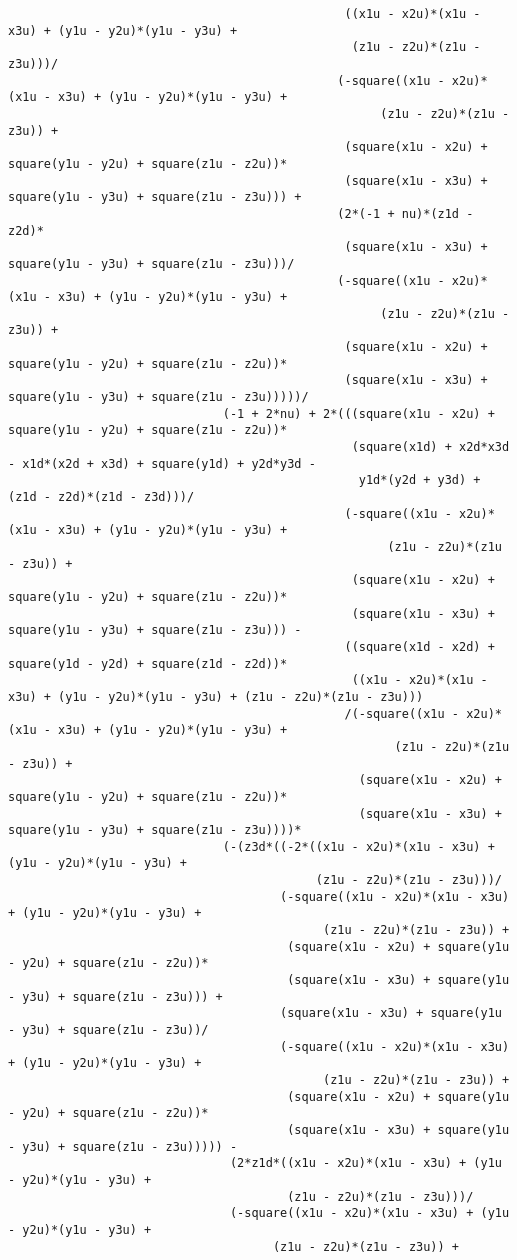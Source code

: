 \begin{lstlisting}
											   ((x1u - x2u)*(x1u - x3u) + (y1u - y2u)*(y1u - y3u) + 
												(z1u - z2u)*(z1u - z3u)))/
											  (-square((x1u - x2u)*(x1u - x3u) + (y1u - y2u)*(y1u - y3u) + 
													(z1u - z2u)*(z1u - z3u)) + 
											   (square(x1u - x2u) + square(y1u - y2u) + square(z1u - z2u))*
											   (square(x1u - x3u) + square(y1u - y3u) + square(z1u - z3u))) + 
											  (2*(-1 + nu)*(z1d - z2d)*
											   (square(x1u - x3u) + square(y1u - y3u) + square(z1u - z3u)))/
											  (-square((x1u - x2u)*(x1u - x3u) + (y1u - y2u)*(y1u - y3u) + 
													(z1u - z2u)*(z1u - z3u)) + 
											   (square(x1u - x2u) + square(y1u - y2u) + square(z1u - z2u))*
											   (square(x1u - x3u) + square(y1u - y3u) + square(z1u - z3u)))))/
							  (-1 + 2*nu) + 2*(((square(x1u - x2u) + square(y1u - y2u) + square(z1u - z2u))*
												(square(x1d) + x2d*x3d - x1d*(x2d + x3d) + square(y1d) + y2d*y3d - 
												 y1d*(y2d + y3d) + (z1d - z2d)*(z1d - z3d)))/
											   (-square((x1u - x2u)*(x1u - x3u) + (y1u - y2u)*(y1u - y3u) + 
													 (z1u - z2u)*(z1u - z3u)) + 
												(square(x1u - x2u) + square(y1u - y2u) + square(z1u - z2u))*
												(square(x1u - x3u) + square(y1u - y3u) + square(z1u - z3u))) - 
											   ((square(x1d - x2d) + square(y1d - y2d) + square(z1d - z2d))*
												((x1u - x2u)*(x1u - x3u) + (y1u - y2u)*(y1u - y3u) + (z1u - z2u)*(z1u - z3u)))
											   /(-square((x1u - x2u)*(x1u - x3u) + (y1u - y2u)*(y1u - y3u) + 
													  (z1u - z2u)*(z1u - z3u)) + 
												 (square(x1u - x2u) + square(y1u - y2u) + square(z1u - z2u))*
												 (square(x1u - x3u) + square(y1u - y3u) + square(z1u - z3u))))*
							  (-(z3d*((-2*((x1u - x2u)*(x1u - x3u) + (y1u - y2u)*(y1u - y3u) + 
										   (z1u - z2u)*(z1u - z3u)))/
									  (-square((x1u - x2u)*(x1u - x3u) + (y1u - y2u)*(y1u - y3u) + 
											(z1u - z2u)*(z1u - z3u)) + 
									   (square(x1u - x2u) + square(y1u - y2u) + square(z1u - z2u))*
									   (square(x1u - x3u) + square(y1u - y3u) + square(z1u - z3u))) + 
									  (square(x1u - x3u) + square(y1u - y3u) + square(z1u - z3u))/
									  (-square((x1u - x2u)*(x1u - x3u) + (y1u - y2u)*(y1u - y3u) + 
											(z1u - z2u)*(z1u - z3u)) + 
									   (square(x1u - x2u) + square(y1u - y2u) + square(z1u - z2u))*
									   (square(x1u - x3u) + square(y1u - y3u) + square(z1u - z3u))))) - 
							   (2*z1d*((x1u - x2u)*(x1u - x3u) + (y1u - y2u)*(y1u - y3u) + 
									   (z1u - z2u)*(z1u - z3u)))/
							   (-square((x1u - x2u)*(x1u - x3u) + (y1u - y2u)*(y1u - y3u) + 
									 (z1u - z2u)*(z1u - z3u)) + 

\end{lstlisting}
